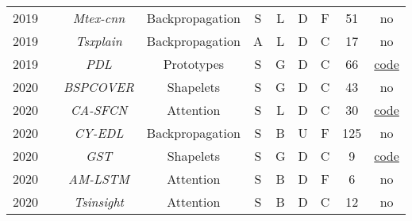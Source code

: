 \begin{table*}[h!]
\begin{tabular}{@{}cccccccccc@{}}
    2019        & \cite{assaf_mtex-cnn_2019}                  &\textit{Mtex-cnn}  & Backpropagation&S       & L         & D      & F                        & 51                & no\\ 

    2019        & \cite{munir_tsxplain_2019}            &\textit{Tsxplain}  &  Backpropagation    &A       & L         & D      & C                    & 17                & no\\  

    2019        & \cite{gee_explaining_2019}        &\textit{PDL}       & Prototypes    &S       & G        & D      & C                    & 66                & \href{https://github.com/alangee/ijcai19-ts-prototypes}{code} \\ 

    2020        & \cite{li_efficient_2022}                   &\textit{\footnotesize{BSPCOVER}}  & Shapelets     & S      & G        & D      & C                    & 43               & no\\  

    
    2020        & \cite{hao_new_2020}                 &\textit{CA-SFCN}   & Attention     &S       & L         & D      & C                    & 30                & \href{https://github.com/huipingcao/nmsu_yhao_ijcai2020}{code}\\ 

    2020        &   \cite{wolanin_estimating_2020}       & \textit{CY-EDL}   & Backpropagation     &S       & B          & U   & F                          & 125               & no \\

    2020        & \cite{kidger_generalised_2020}& \textit{GST}      & Shapelets     &S       & G        & D      & C                    & 9                 & \href{https://github.com/patrick-kidger/generalised_shapelets}{code}\\  

    2020        & \cite{schockaert_attention_2020} & \textit{\footnotesize{AM-LSTM}}& Attention&S       & B          & D      & F                       & 6                 & no\\ 

    2020        & \cite{siddiqui_tsinsight_2020}& \textit{Tsinsight}& Attention   &S       &B           & D      & C                    & 12                & no \\ 


\end{tabular}
\end{table*}

